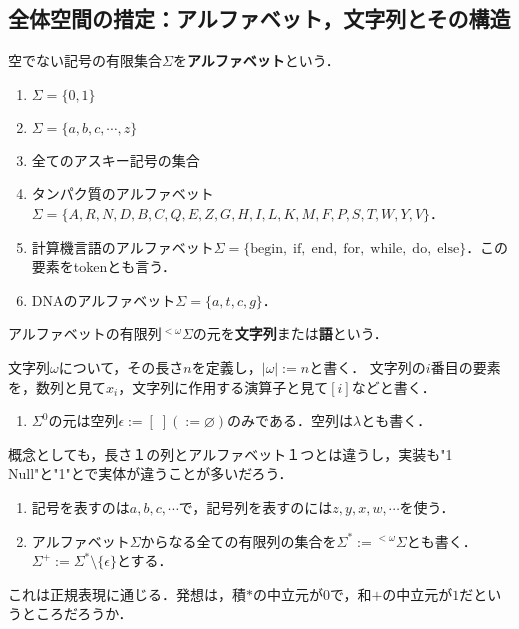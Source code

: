 \documentclass[uplatex, 12pt, dvipdfmx]{jsreport}
\begin{document}
\subsection{全体空間の措定：アルファベット，文字列とその構造}

\begin{definition}[alphabet]
    空でない記号の有限集合$\Sigma$を\textbf{アルファベット}という．
\end{definition}
\begin{example}\mbox{}
    \begin{enumerate}
        \item $\Sigma=\{0,1\}$
        \item $\Sigma=\{a,b,c,\cdots,z\}$
        \item 全てのアスキー記号の集合
        \item タンパク質のアルファベット$\Sigma=\{A,R,N,D,B,C,Q,E,Z,G,H,I,L,K,M,F,P,S,T,W,Y,V\}$．
        \item 計算機言語のアルファベット$\Sigma=\{\mathrm{begin,\;if,\;end,\;for,\;while,\;do,\;else}\}$．この要素をtokenとも言う．
        \item DNAのアルファベット$\Sigma=\{a,t,c,g\}$．
    \end{enumerate}
\end{example}

\begin{definition}
    アルファベットの有限列${}^{<\omega}\Sigma$の元を\textbf{文字列}または\textbf{語}という．

    文字列$\omega$について，その長さ$n$を定義し，$|\omega|:=n$と書く．
    文字列の$i$番目の要素を，数列と見て$x_i$，文字列に作用する演算子と見て$[i]$などと書く．
\end{definition}
\begin{example}\mbox{}
    \begin{enumerate}
        \item $\Sigma^0$の元は空列$\epsilon:=[\;](:=\varnothing)$のみである．空列は$\lambda$とも書く．
    \end{enumerate}
\end{example}
\begin{remark}
    概念としても，長さ１の列とアルファベット１つとは違うし，実装も"1 Null"と"1"とで実体が違うことが多いだろう．
\end{remark}
\begin{notation}\mbox{}
    \begin{enumerate}
        \item 記号を表すのは$a,b,c,\cdots$で，記号列を表すのには$z,y,x,w,\cdots$を使う．
        \item アルファベット$\Sigma$からなる全ての有限列の集合を$\Sigma^*:={}^{<\omega}\Sigma$とも書く．
        $\Sigma^+:=\Sigma^*\setminus\{\epsilon\}$とする．
    \end{enumerate}
\end{notation}
\begin{remark}
    これは正規表現に通じる．発想は，積$*$の中立元が$0$で，和$+$の中立元が$1$だというところだろうか．
\end{remark}
\end{document}
